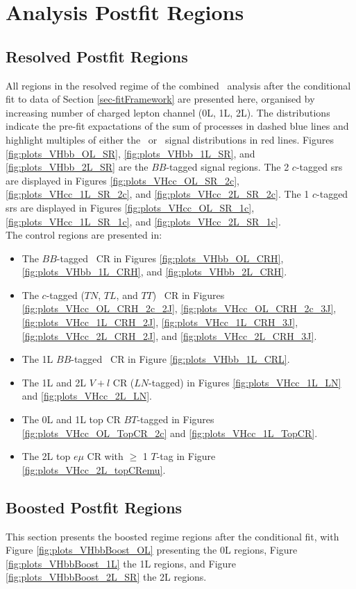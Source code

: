 \section{Analysis Postfit Regions}\label{appsec-vh-analRegPosfit}
\subsection{Resolved Postfit Regions}\label{appsec-vh-analRegResPosfit}
All regions in the resolved regime of the combined \vhbc\ analysis after the conditional fit to data of Section \ref{sec-fitFramework} are presented here, organised by increasing number of charged lepton channel (0L, 1L, 2L). The distributions indicate the pre-fit expactations of the sum of processes in dashed blue lines and highlight multiples of either the \vhb\ or \vhc\ signal distributions in red lines. Figures \ref{fig:plots_VHbb_OL_SR}, \ref{fig:plots_VHbb_1L_SR}, and \ref{fig:plots_VHbb_2L_SR} are the $BB$-tagged signal regions. The 2 $c$-tagged \glspl{sr} are displayed in Figures \ref{fig:plots_VHcc_OL_SR_2c}, \ref{fig:plots_VHcc_1L_SR_2c}, and \ref{fig:plots_VHcc_2L_SR_2c}.  The 1 $c$-tagged \glspl{sr} are displayed in Figures \ref{fig:plots_VHcc_OL_SR_1c}, \ref{fig:plots_VHcc_1L_SR_1c}, and \ref{fig:plots_VHcc_2L_SR_1c}. \\

The control regions are presented in:
\begin{itemize}
  \item The $BB$-tagged \highdr\ CR in Figures \ref{fig:plots_VHbb_OL_CRH}, \ref{fig:plots_VHbb_1L_CRH}, and \ref{fig:plots_VHbb_2L_CRH}.
  \item The $c$-tagged ($TN$, $TL$, and $TT$) \highdr\ CR in Figures \ref{fig:plots_VHcc_OL_CRH_2c_2J}, \ref{fig:plots_VHcc_OL_CRH_2c_3J}, \ref{fig:plots_VHcc_1L_CRH_2J}, \ref{fig:plots_VHcc_1L_CRH_3J}, \ref{fig:plots_VHcc_2L_CRH_2J}, and \ref{fig:plots_VHcc_2L_CRH_3J}.
  \item The 1L $BB$-tagged \lowdr\ CR in Figure \ref{fig:plots_VHbb_1L_CRL}.
  \item The 1L and 2L $V+l$ CR ($LN$-tagged) in Figures \ref{fig:plots_VHcc_1L_LN} and \ref{fig:plots_VHcc_2L_LN}.
  \item The 0L and 1L top CR $BT$-tagged in Figures \ref{fig:plots_VHcc_OL_TopCR_2c} and \ref{fig:plots_VHcc_1L_TopCR}.
  \item The 2L top $e\mu$ CR with $\geq$ 1 $T$-tag in Figure \ref{fig:plots_VHcc_2L_topCRemu}.
\end{itemize}
  
\subsection{Boosted Postfit Regions}\label{appsec-vh-analRegBooPosfit}
This section presents the boosted regime regions after the conditional fit, with Figure \ref{fig:plots_VHbbBoost_OL} presenting the 0L regions, Figure \ref{fig:plots_VHbbBoost_1L} the 1L regions, and Figure \ref{fig:plots_VHbbBoost_2L_SR} the 2L regions.

\clearpage

\clearpage 

\clearpage
